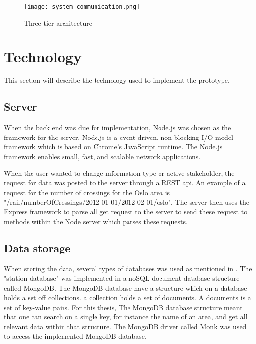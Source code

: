 \begin{figure}[!htbp]
	\texttt{[image: system-communication.png]}
	\caption[Three-tier architecture]{Three-tier architecture}
	\label{fig:three-tier_architecture}
\end{figure}

\section{Technology} %
This section will describe the technology used to implement the prototype.
\label{sec:technology}

\subsection{Server} %
\label{sub:server}
When the back end was due for implementation, Node.js\cite{nodeJs} was chosen 
as the framework for the server. Node.js is a event-driven, non-blocking  I/O
model framework which is based on Chrome's\cite{chromeJavaScriptEngine} 
JavaScript runtime. The Node.js framework enables small, fast, and scalable 
network applications.

When the user wanted to change information type or active stakeholder, the
request for data was posted to the server through a REST\cite{REST} api. An
example of a request for the number of crossings for the Oslo area is
"/rail/numberOfCrossings/2012-01-01/2012-02-01/oslo". The server then uses the
Express\cite{express} framework to parse all get request to the server to send
these request to methods within the Node server which parses these requests.



\subsection{Data storage} %
\label{sub:technology_data_storage}
When storing the data, several types of databases was used as mentioned in
. The "station database" was implemented in
a noSQL document database structure called MongoDB\cite{mongoDB}. The MongoDB
database have a structure which on a database holds a set off collections. a
collection holds a set of documents. A documents is a set of key-value pairs.
For this thesis, The MongoDB database structure meant that one can search 
on a single key, for instance the name of an area, and get all relevant data 
within that structure. The MongoDB driver called Monk\cite{npmMonk} was used 
to access the implemented MongoDB database.\\

